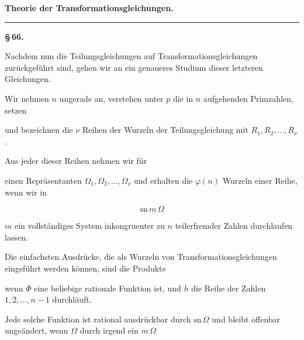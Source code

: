 \begin{center}

\medskip
{\Large\textbf{Theorie der Transformationsgleichungen.}}

\medskip
\rule{3cm}{0.4pt}
\end{center}

\begin{center}
\textbf{\S\,66. }
\end{center}

Nachdem nun die Teilungsgleichungen auf Transformationsgleichungen zurückgeführt sind, gehen wir an ein genaueres Studium dieser letzteren Gleichungen.

Wir nehmen $n$ ungerade an, verstehen unter $p$ die in $n$ aufgehenden Primzahlen, setzen


und bezeichnen die $\nu$ Reihen der Wurzeln der Teilungsgleichung mit $R_1, R_2, \ldots, R_\nu$.

Aus jeder dieser Reihen nehmen wir für


einen Repräsentanten $\Omega_1, \Omega_2, \ldots, \Omega_\nu$ und erhalten die $\varphi(n)$ Wurzeln einer Reihe, wenn wir in

\[
\mathrm{sn}\, m\,\Omega
\]

$m$ ein vollständiges System inkongruenter zu $n$ teilerfremder Zahlen durchlaufen lassen.

Die einfachsten Ausdrücke, die als Wurzeln von Transformationsgleichungen eingeführt werden können, sind die Produkte


wenn $\Phi$ eine beliebige rationale Funktion ist, und $h$ die Reihe der Zahlen $1, 2, \ldots, n-1$ durchläuft.

Jede solche Funktion ist rational ausdrückbar durch $\mathrm{sn}\,\Omega$ und bleibt offenbar ungeändert, wenn $\Omega$ durch irgend ein $m\,\Omega$
